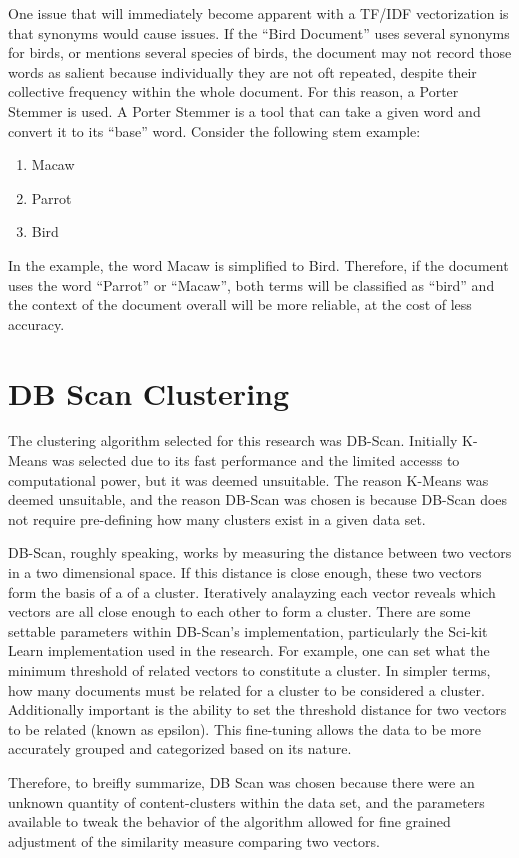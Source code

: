 One issue that will immediately become apparent with a TF/IDF
vectorization is that synonyms would cause issues. If the ``Bird
Document'' uses several synonyms for birds, or mentions several
species of birds, the document may not record those words as salient
because individually they are not oft repeated, despite their
collective frequency within the whole document. For this reason,
a Porter Stemmer is used. A Porter Stemmer is a tool that can take
a given word and convert it to its ``base'' word. Consider the following
stem example:

\begin{enumerate}
\item Macaw
\item Parrot
\item Bird
\end{enumerate}

In the example, the word Macaw is simplified to Bird. Therefore, if
the document uses the word ``Parrot'' or ``Macaw'', both terms will be
classified as ``bird'' and the context of the document overall will be
more reliable, at the cost of less accuracy.

\section{DB Scan Clustering}
The clustering algorithm selected for this research was
DB-Scan. Initially K-Means was selected due to its fast performance
and the limited accesss to computational power, but it was deemed
unsuitable. The reason K-Means was deemed unsuitable, and the reason
DB-Scan was chosen is because DB-Scan does not require pre-defining
how many clusters exist in a given data set.

DB-Scan, roughly speaking, works by measuring the distance between two
vectors in a two dimensional space. If this distance is close enough,
these two vectors form the basis of a of a cluster. Iteratively
analayzing each vector reveals which vectors are all close enough to
each other to form a cluster. There are some settable parameters
within DB-Scan's implementation, particularly the Sci-kit Learn
implementation used in the research. For example, one can set what the
minimum threshold of related vectors to constitute a cluster. In
simpler terms, how many documents must be related for a cluster to be
considered a cluster. Additionally important is the ability to set the
threshold distance for two vectors to be related (known as
epsilon). This fine-tuning allows the data to be more accurately
grouped and categorized based on its nature.

Therefore, to breifly summarize, DB Scan was chosen because there were
an unknown quantity of content-clusters within the data set, and the
parameters available to tweak the behavior of the algorithm allowed
for fine grained adjustment of the similarity measure comparing two
vectors.
